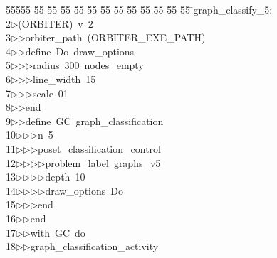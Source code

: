 %
%
\begin{tabbing}
55555 \= 55 \= 55 \= 55 \= 55 \= 55 \= 55 \= 55 \= 55 \= 55 \= 55 \= 55 \= 55 \= \>graph\_classify\_5:\\[0pt]
2\>$\triangleright$\>(ORBITER)\ v\ 2\ \\[0pt]
3\>$\triangleright$\>$\triangleright$\>orbiter\_path\ (ORBITER\_EXE\_PATH)\ \\[0pt]
4\>$\triangleright$\>$\triangleright$\>define\ Do\ draw\_options\ \\[0pt]
5\>$\triangleright$\>$\triangleright$\>$\triangleright$\>radius\ 300\ nodes\_empty\ \\[0pt]
6\>$\triangleright$\>$\triangleright$\>$\triangleright$\>line\_width\ 15\ \ \\[0pt]
7\>$\triangleright$\>$\triangleright$\>$\triangleright$\>scale\ 01\ \\[0pt]
8\>$\triangleright$\>$\triangleright$\>end\ \\[0pt]
9\>$\triangleright$\>$\triangleright$\>define\ GC\ graph\_classification\ \\[0pt]
10\>$\triangleright$\>$\triangleright$\>$\triangleright$\>n\ 5\ \\[0pt]
11\>$\triangleright$\>$\triangleright$\>$\triangleright$\>poset\_classification\_control\ \\[0pt]
12\>$\triangleright$\>$\triangleright$\>$\triangleright$\>$\triangleright$\>problem\_label\ graphs\_v5\ \\[0pt]
13\>$\triangleright$\>$\triangleright$\>$\triangleright$\>$\triangleright$\>depth\ 10\ \\[0pt]
14\>$\triangleright$\>$\triangleright$\>$\triangleright$\>$\triangleright$\>draw\_options\ Do\ \\[0pt]
15\>$\triangleright$\>$\triangleright$\>$\triangleright$\>end\ \\[0pt]
16\>$\triangleright$\>$\triangleright$\>end\ \\[0pt]
17\>$\triangleright$\>$\triangleright$\>with\ GC\ do\ \\[0pt]
18\>$\triangleright$\>$\triangleright$\>graph\_classification\_activity\ \\[0pt]

\end{tabbing}
